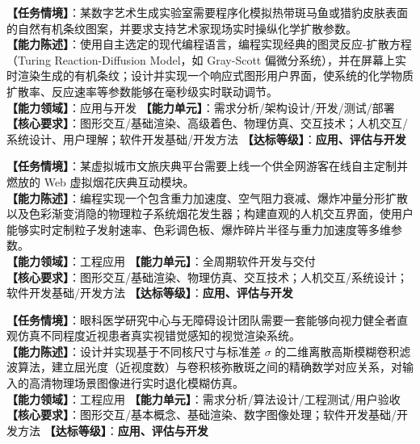 \begin{taskbox}
\textbf{【任务情境】}：某数字艺术生成实验室需要程序化模拟热带斑马鱼或猎豹皮肤表面的自然有机条纹图案，并要求支持艺术家现场实时操纵化学扩散参数。\\
\textbf{【能力陈述】}：使用自主选定的现代编程语言，编程实现经典的图灵反应-扩散方程（Turing Reaction-Diffusion Model，如 Gray-Scott 偏微分系统），并在屏幕上实时渲染生成的有机条纹；设计并实现一个响应式图形用户界面，使系统的化学物质扩散率、反应速率等参数能够在毫秒级实时联动调节。\\
\textbf{【能力领域】}：应用与开发 \quad \textbf{【能力单元】}：需求分析/架构设计/开发/测试/部署\\
\textbf{【核心要求】}：图形交互/基础渲染、高级着色、物理仿真、交互技术；人机交互/系统设计、用户理解；软件开发基础/开发方法 \quad \textbf{【达标等级】}：\textbf{应用、评估与开发}
\end{taskbox}

\begin{taskbox}[任务 5：高交互可定制的粒子系统数字烟花仿真引擎]
\textbf{【任务情境】}：某虚拟城市文旅庆典平台需要上线一个供全网游客在线自主定制并燃放的 Web 虚拟烟花庆典互动模块。\\
\textbf{【能力陈述】}：编程实现一个包含重力加速度、空气阻力衰减、爆炸冲量分形扩散以及色彩渐变消隐的物理粒子系统烟花发生器；构建直观的人机交互界面，使用户能够实时定制粒子发射速率、色彩调色板、爆炸碎片半径与重力加速度等多维参数。\\
\textbf{【能力领域】}：工程应用 \quad \textbf{【能力单元】}：全周期软件开发与交付\\
\textbf{【核心要求】}：图形交互/基础渲染、物理仿真、交互技术；人机交互/系统设计；软件开发基础/开发方法 \quad \textbf{【达标等级】}：\textbf{应用、评估与开发}
\end{taskbox}

\begin{taskbox}[任务 6：基于高斯卷积核的人类屈光不正视力障碍仿真滤镜]
\textbf{【任务情境】}：眼科医学研究中心与无障碍设计团队需要一套能够向视力健全者直观仿真不同程度近视患者真实视错觉感知的视觉渲染系统。\\
\textbf{【能力陈述】}：设计并实现基于不同核尺寸与标准差 $\sigma$ 的二维离散高斯模糊卷积滤波算法，建立屈光度（近视度数）与卷积核弥散斑之间的精确数学对应关系，对输入的高清物理场景图像进行实时退化模糊仿真。\\
\textbf{【能力领域】}：工程应用 \quad \textbf{【能力单元】}：需求分析/算法设计/工程测试/用户验收\\
\textbf{【核心要求】}：图形交互/基本概念、基础渲染、数字图像处理；软件开发基础/开发方法 \quad \textbf{【达标等级】}：\textbf{应用、评估与开发}
\end{taskbox}

